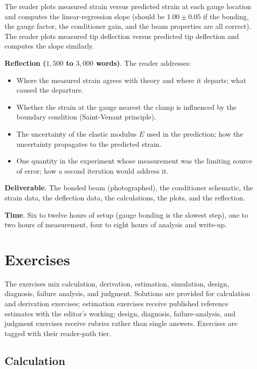 \begin{project}
The reader plots measured strain versus predicted strain at each
gauge location and computes the linear-regression slope (should be
$1.00 \pm 0.05$ if the bonding, the gauge factor, the conditioner
gain, and the beam properties are all correct). The reader plots
measured tip deflection versus predicted tip deflection and computes
the slope similarly.

\textbf{Reflection ($1{,}500$ to $3{,}000$ words)}. The reader
addresses:

\begin{itemize}[leftmargin=*]
  \item Where the measured strain agrees with theory and where it
    departs; what caused the departure.
  \item Whether the strain at the gauge nearest the clamp is
    influenced by the boundary condition (Saint-Venant principle).
  \item The uncertainty of the elastic modulus $E$ used in the
    prediction; how the uncertainty propagates to the predicted
    strain.
  \item One quantity in the experiment whose measurement was the
    limiting source of error; how a second iteration would address
    it.
\end{itemize}

\textbf{Deliverable}. The bonded beam (photographed), the
conditioner schematic, the strain data, the deflection data, the
calculations, the plots, and the reflection.

\textbf{Time}. Six to twelve hours of setup (gauge bonding is the
slowest step), one to two hours of measurement, four to eight hours
of analysis and write-up.
\end{project}

\section{Exercises}

The exercises mix calculation, derivation, estimation, simulation,
design, diagnosis, failure analysis, and judgment. Solutions are
provided for calculation and derivation exercises; estimation
exercises receive published reference estimates with the editor's
working; design, diagnosis, failure-analysis, and judgment exercises
receive rubrics rather than single answers. Exercises are tagged
with their reader-path tier.

\subsection*{Calculation}

